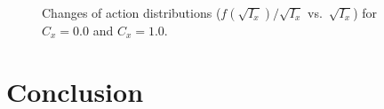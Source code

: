\documentclass[aps,prstab,onecolumn,preprint]{revtex4-1}
\begin{document}
\begin{figure}[!tbp]
  \caption{\label{fig:rfko2}Changes of action distributions ($f(\sqrt{I_{x}}) / \sqrt{I_{x}}$ vs.~$\sqrt{I_{x}}$) for $C_{x} = 0.0$ and $C_{x} = 1.0$.}
\end{figure}


\section{\label{sec:conclusion}Conclusion}
\end{document}
